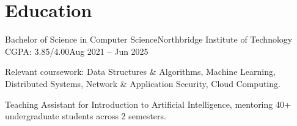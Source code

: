 \section{\textbf{Education}}
  \resumeSubHeadingListStart
    \resumeEntry
      {Bachelor of Science in Computer Science}{Northbridge Institute of Technology}
      {CGPA: 3.85/4.00}{Aug 2021 -- Jun 2025}
      \vspace{-2.0mm}
      \resumeItemListStart
        \item {Relevant coursework: Data Structures \& Algorithms, Machine Learning, Distributed Systems, Network \& Application Security, Cloud Computing.}
        \item {Teaching Assistant for Introduction to Artificial Intelligence, mentoring 40+ undergraduate students across 2 semesters.}
      \resumeItemListEnd
  \resumeSubHeadingListEnd
\vspace{-5.5mm}
